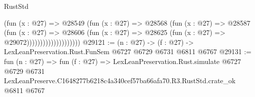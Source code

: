 \begin{lexlean}{RustStd}
\begin{coremodule}
                                (fun (x : @27) =>
                                @28549
                                  (fun (x : @27) =>
                                  @28568
                                    (fun (x : @27) =>
                                    @28587
                                      (fun (x : @27) =>
                                      @28606
                                        (fun (x : @27) =>
                                        @28625 (fun (x : @27) => @29072))))))))))))))))))))
@29121 := (n : @27) -> (f : @27) -> LexLeanPreservation.Rust.FunSem @6727 @6729 @6731 @6811 @6767
@29131 := fun (n : @27) =>
  fun (f : @27) =>
  LexLeanPreservation.Rust.simulate
    @6727
    @6729
    @6731
    LexLeanPreserve.C1648277b6218c4a340cef57ba66afa70.R3.RustStd.crate_ok
    @6811
    @6767
\end{coremodule}
\end{lexlean}
